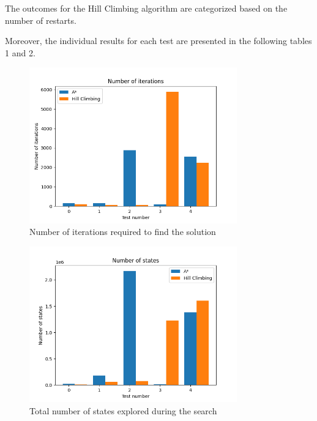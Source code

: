 \documentclass[runningheads]{paper}
\begin{document}
The outcomes for the Hill Climbing algorithm are categorized based on the 
number of restarts.

Moreover, the individual results for each test are presented in the following
tables 1 and 2.

\begin{figure}[!]
\centering
\includegraphics[width=0.8\textwidth]{./images/iterations.png}
\caption{Number of iterations required to find the solution}
\label{fig:empty_graphs}
\end{figure}

\begin{figure}[!]
\centering
\includegraphics[width=0.8\textwidth]{./images/states.png}
\caption{Total number of states explored during the search}
\label{fig:complete_graphs}
\end{figure}
\end{document}
